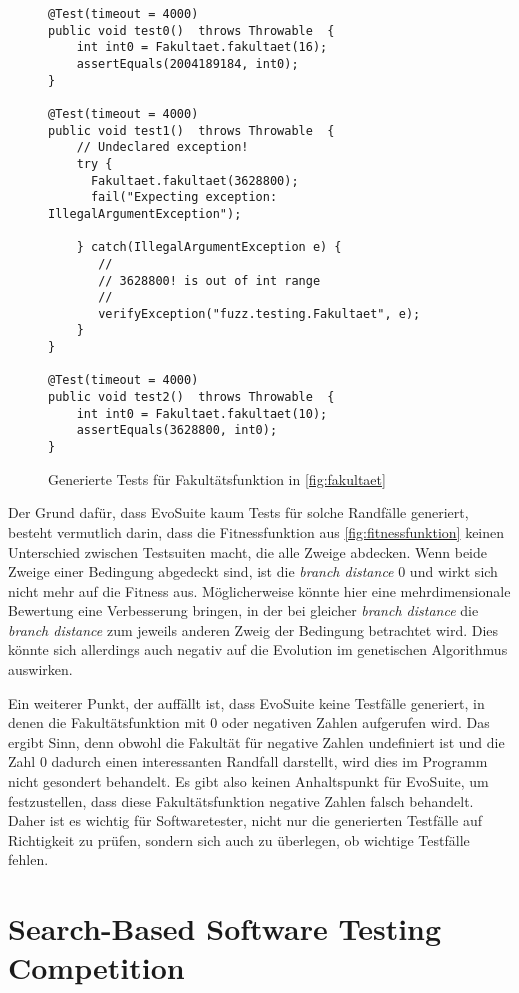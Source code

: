 \documentclass[a4paper,11pt]{article}
\begin{document}
\begin{figure}[h]
	\begin{lstlisting}[basicstyle=\ttfamily\tiny]
@Test(timeout = 4000)
public void test0()  throws Throwable  {
    int int0 = Fakultaet.fakultaet(16);
    assertEquals(2004189184, int0);
}

@Test(timeout = 4000)
public void test1()  throws Throwable  {
    // Undeclared exception!
    try { 
      Fakultaet.fakultaet(3628800);
      fail("Expecting exception: IllegalArgumentException");
    
    } catch(IllegalArgumentException e) {
       //
       // 3628800! is out of int range
       //
       verifyException("fuzz.testing.Fakultaet", e);
    }
}

@Test(timeout = 4000)
public void test2()  throws Throwable  {
    int int0 = Fakultaet.fakultaet(10);
    assertEquals(3628800, int0);
}
	\end{lstlisting}
	\caption{Generierte Tests für Fakultätsfunktion in \cref{fig:fakultaet}}
	\label{fig:fakultaet_tests}
\end{figure}

Der Grund dafür, dass EvoSuite kaum Tests für solche Randfälle generiert, besteht vermutlich darin, dass die Fitnessfunktion aus \cref{fig:fitnessfunktion} keinen Unterschied zwischen Testsuiten macht, die alle Zweige abdecken.
Wenn beide Zweige einer Bedingung abgedeckt sind, ist die \textit{branch distance} 0 und wirkt sich nicht mehr auf die Fitness aus.
Möglicherweise könnte hier eine mehrdimensionale Bewertung eine Verbesserung bringen, in der bei gleicher \textit{branch distance} die \textit{branch distance} zum jeweils anderen Zweig der Bedingung betrachtet wird.
Dies könnte sich allerdings auch negativ auf die Evolution im genetischen Algorithmus auswirken.

Ein weiterer Punkt, der auffällt ist, dass EvoSuite keine Testfälle generiert, in denen die Fakultätsfunktion mit 0 oder negativen Zahlen aufgerufen wird.
Das ergibt Sinn, denn obwohl die Fakultät für negative Zahlen undefiniert ist und die Zahl 0 dadurch einen interessanten Randfall darstellt, wird dies im Programm nicht gesondert behandelt.
Es gibt also keinen Anhaltspunkt für EvoSuite, um festzustellen, dass diese Fakultätsfunktion negative Zahlen falsch behandelt.
Daher ist es wichtig für Softwaretester, nicht nur die generierten Testfälle auf Richtigkeit zu prüfen, sondern sich auch zu überlegen, ob wichtige Testfälle fehlen.

\section{Search-Based Software Testing Competition}
\end{document}
